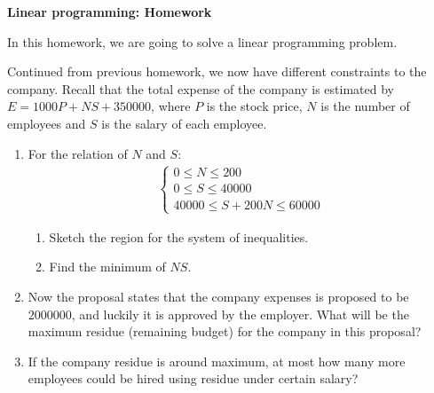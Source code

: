 \documentclass[12pt]{article}
\begin{document}
    \begin{center}
        \textbf{Linear programming: Homework}
    \end{center}

    In this homework, we are going to solve a linear programming problem.

    Continued from previous homework, we now have different constraints to the company. Recall that the total expense of the company is estimated by $E=1000P+NS+350000$, where $P$ is the stock price, $N$ is the number of employees and $S$ is the salary of each employee.

    \begin{enumerate}
        \item For the relation of $N$ and $S$:\begin{align*}
            \begin{cases}
                0\leq N\leq 200\\
                0\leq S\leq 40000\\
                40000\leq S+200N \leq 60000
            \end{cases}
        \end{align*}
        \begin{enumerate}
            \item Sketch the region for the system of inequalities.
            \item Find the minimum of $NS$.
        \end{enumerate}
        \item Now the proposal states that the company expenses is proposed to be $2000000$, and luckily it is approved by the employer. What will be the maximum residue (remaining budget) for the company in this proposal?
        \item If the company residue is around maximum, at most how many more employees could be hired using residue under certain salary?
    \end{enumerate}
\end{document}
